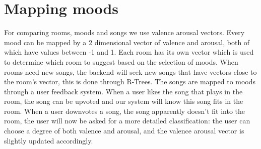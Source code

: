 \section{Mapping moods}
For comparing rooms, moods and songs we use valence arousal vectors. Every mood can be mapped by a 2 dimensional vector of valence and arousal,
both of which have values between -1 and 1. Each room has its own vector which is used to determine which room to suggest based on
the selection of moods. When rooms need new songs, the backend will seek new songs that have vectors close to the room's vector, this is done
through R-Trees.
The songs are mapped to moods through a user feedback system. When a user likes the song that plays in the room,
the song can be upvoted and our system will know this song fits in the room.
When a user downvotes a song, the song apparently doesn't fit into the room, the user will now be asked for a more detailed
classification: the user can choose a degree of both valence and arousal, and the valence arousal vector is slightly updated accordingly.
